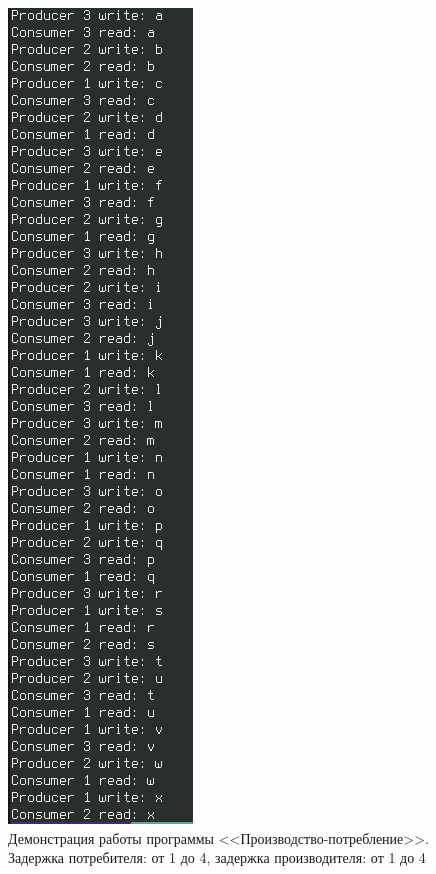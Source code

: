 \documentclass[12pt]{report}
\begin{document}
\begin{figure}[H]
	\centering
	\includegraphics[scale=0.55]{img/prod-cons-01.png}
	\caption{Демонстрация работы программы <<Производство-потребление>>. Задержка потребителя: от 1 до 4, задержка производителя: от 1 до 4}
	\label{fig:task01-01}
\end{figure}
\end{document}
